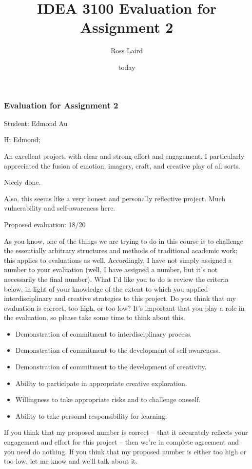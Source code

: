 \documentclass[letterpaper,10pt,DIV=9,headsepline]{scrreprt}
\author{Ross Laird}
\title{IDEA 3100 Evaluation for Assignment 2}
\date{today}
\begin{document}
\pagestyle{scrheadings}
\setcounter{secnumdepth}{-1}

\subsubsection{Evaluation for Assignment 2}

Student: Edmond Au

\bigskip
Hi Edmond;

An excellent project, with clear and strong effort and engagement. I
particularly appreciated the fusion of emotion, imagery, craft, and
creative play of all sorts.

Nicely done.

Also, this seems like a very honest and personally reflective project.
Much vulnerability and self-awareness here.



\bigskip
Proposed evaluation: 18/20

\bigskip
As you know, one of the things we are trying to do in this course is
to challenge the essentially arbitrary structures and methods of
traditional academic work; this applies to evaluations as well.
Accordingly, I have not simply assigned a number to your evaluation
(well, I have assigned a number, but it's not necessarily the final
number). What I'd like you to do is review the criteria below, in
light of your knowledge of the extent to which you applied
interdisciplinary and creative strategies to this project. Do you
think that my evaluation is correct, too high, or too low? It's
important that you play a role in the evaluation, so please take some
time to think about this.

\begin{itemize}
\item Demonstration of commitment to interdisciplinary process.
\item Demonstration of commitment to the development of self-awareness.
\item Demonstration of commitment to the development of creativity.
\item Ability to participate in appropriate creative exploration.
\item Willingness to take appropriate risks and to challenge oneself.
\item Ability to take personal responsibility for learning.
\end{itemize}

If you think that my proposed number is correct -- that it accurately
reflects your engagement and effort for this project -- then we're in
complete agreement and you need do nothing. If you think that my
proposed number is either too high or too low, let me know and we'll
talk about it.
\end{document}
